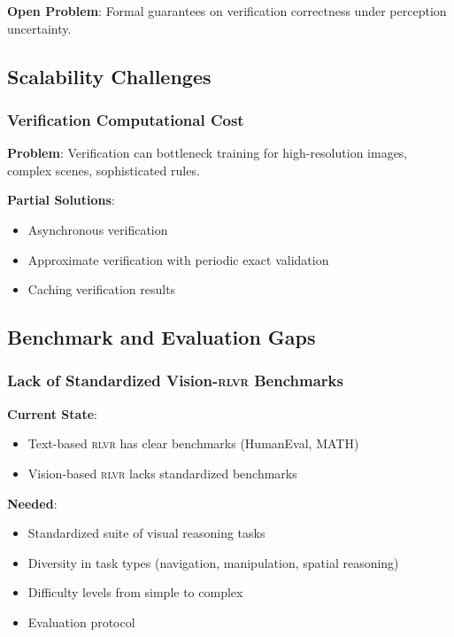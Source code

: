 \documentclass[11pt,a4paper]{article}
\newcommand{\rlvr}{\textsc{rlvr}}
\begin{document}
\textbf{Open Problem}: Formal guarantees on verification correctness under perception uncertainty.

\subsection{Scalability Challenges}
\label{sec:scalability_challenges}

\subsubsection{Verification Computational Cost}

\textbf{Problem}: Verification can bottleneck training for high-resolution images, complex scenes, sophisticated rules.

\textbf{Partial Solutions}:
\begin{itemize}[leftmargin=*]
    \item Asynchronous verification
    \item Approximate verification with periodic exact validation
    \item Caching verification results
\end{itemize}

\subsection{Benchmark and Evaluation Gaps}
\label{sec:benchmark_gaps}

\subsubsection{Lack of Standardized Vision-\rlvr{} Benchmarks}

\textbf{Current State}:
\begin{itemize}[leftmargin=*]
    \item Text-based \rlvr{} has clear benchmarks (HumanEval, MATH)
    \item Vision-based \rlvr{} lacks standardized benchmarks
\end{itemize}

\textbf{Needed}:
\begin{itemize}[leftmargin=*]
    \item Standardized suite of visual reasoning tasks
    \item Diversity in task types (navigation, manipulation, spatial reasoning)
    \item Difficulty levels from simple to complex
    \item Evaluation protocol
\end{itemize}
\end{document}
